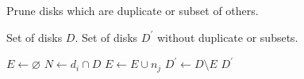 \documentclass[journal,onecolumn]{IEEEtran}
\begin{document}
\begin{algorithm}
    \caption{Prune disks which are duplicate or subset of others.}
    \begin{algorithmic}[1]
        \Require Set of disks $D$.
        \Ensure Set of disks $D^{\prime}$ without duplicate or subsets.
        
        \State $E \gets \varnothing$
            \State $N \gets d_i \cap D$
                        \State $E \gets E \cup {n_j}$
                \EndIf
            \EndFor
        \EndFor        
        \State $D^{\prime} \gets D \setminus E$
        \State \Return $D^{\prime}$
        \EndFunction
    \end{algorithmic}
\end{algorithm}



\end{document}
